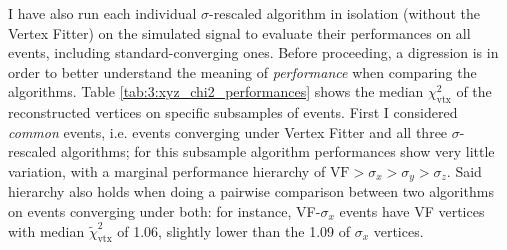 I have also run each individual $\sigma$-rescaled algorithm in isolation (without the Vertex Fitter) on the simulated signal to evaluate their performances on all events, including standard-converging ones.
Before proceeding, a digression is in order to better understand the meaning of \textit{performance} when comparing the algorithms.
Table \ref{tab:3:xyz_chi2_performances} shows the median $\chi^2_\text{vtx}$ of the reconstructed vertices on specific subsamples of events.
First I considered \textit{common} events, i.e. events converging under Vertex Fitter and all three $\sigma$-rescaled algorithms;
for this subsample algorithm performances show very little variation, with a marginal performance hierarchy of $\text{VF} > \sigma_x > \sigma_y > \sigma_z$.
Said hierarchy also holds when doing a pairwise comparison between two algorithms on events converging under both:
for instance, VF-$\sigma_x$ events have VF vertices with median $\tilde{\chi}^2_\text{vtx}$ of 1.06, slightly lower than the 1.09 of $\sigma_x$ vertices.

